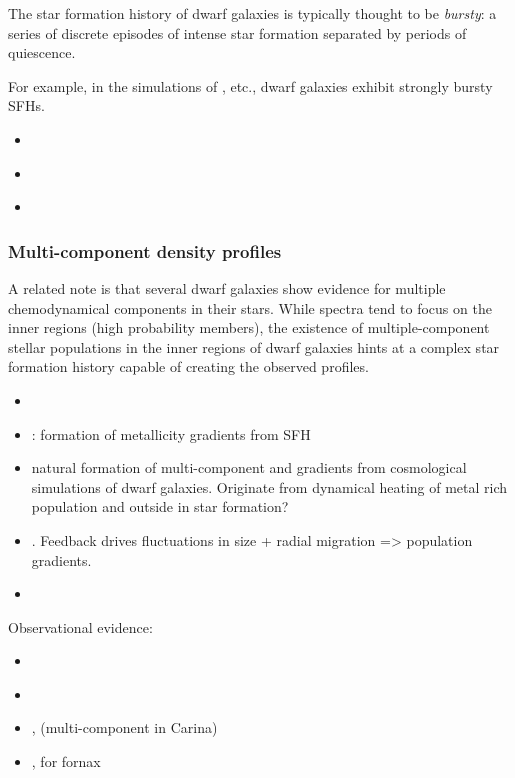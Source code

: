 The star formation history of dwarf galaxies is typically thought to be
\emph{bursty}: a series of discrete episodes of intense star formation
separated by periods of quiescence.

For example, in the simulations of \citet{wheeler+2019}, etc., dwarf
galaxies exhibit strongly bursty SFHs.

\begin{itemize}
\tightlist
\item
  \citet{maxwell+2012}
\item
  \citet{wright+2019}
\item
  \citet{azartash-namin+2024}
\end{itemize}

\subsubsection{Multi-component density
profiles}\label{multi-component-density-profiles}

A related note is that several dwarf galaxies show evidence for multiple
chemodynamical components in their stars. While spectra tend to focus on
the inner regions (high probability members), the existence of
multiple-component stellar populations in the inner regions of dwarf
galaxies hints at a complex star formation history capable of creating
the observed profiles.

\begin{itemize}
\tightlist
\item
  \citet{benitez-llambay+2016}
\item
  \citet{mercado+2021}: formation of metallicity gradients from SFH
\item
  \citet{revaz+jablonka2018} natural formation of multi-component and
  gradients from cosmological simulations of dwarf galaxies. Originate
  from dynamical heating of metal rich population and outside in star
  formation?
\item
  \citet{el-badry+2016}. Feedback drives fluctuations in size + radial
  migration =\textgreater{} population gradients.
\item
\end{itemize}

Observational evidence:

\begin{itemize}
\tightlist
\item
  \citet{arronyo-polonio+2024}
\item
  \citet{pace+2020}
\item
  \citet{fabrizio+2016}, \citet{kordopatis+2016} (multi-component in
  Carina)
\item
  \citet{battaglia+2006}, \citet{amorisco+evans2012} for fornax
\end{itemize}

